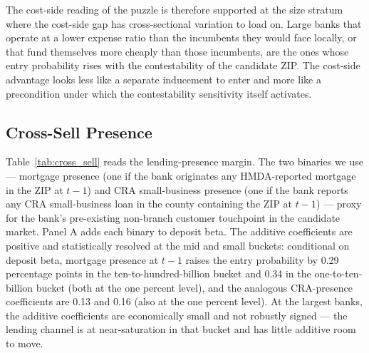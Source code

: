 The cost-side reading of the puzzle is therefore supported at the size stratum where the cost-side gap has cross-sectional variation to load on. Large banks that operate at a lower expense ratio than the incumbents they would face locally, or that fund themselves more cheaply than those incumbents, are the ones whose entry probability rises with the contestability of the candidate ZIP. The cost-side advantage looks less like a separate inducement to enter and more like a precondition under which the contestability sensitivity itself activates.

\subsection{Cross-Sell Presence}
\label{sec:results:crosssell}

Table~\ref{tab:cross_sell} reads the lending-presence margin. The two binaries we use --- mortgage presence (one if the bank originates any HMDA-reported mortgage in the ZIP at $t-1$) and CRA small-business presence (one if the bank reports any CRA small-business loan in the county containing the ZIP at $t-1$) --- proxy for the bank's pre-existing non-branch customer touchpoint in the candidate market. Panel A adds each binary to deposit beta. The additive coefficients are positive and statistically resolved at the mid and small buckets: conditional on deposit beta, mortgage presence at $t-1$ raises the entry probability by 0.29 percentage points in the ten-to-hundred-billion bucket and 0.34 in the one-to-ten-billion bucket (both at the one percent level), and the analogous CRA-presence coefficients are 0.13 and 0.16 (also at the one percent level). At the largest banks, the additive coefficients are economically small and not robustly signed --- the lending channel is at near-saturation in that bucket and has little additive room to move.

